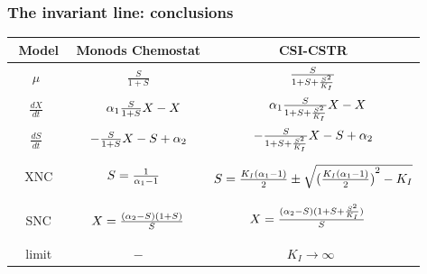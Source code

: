 \documentclass[a4paper, 10pt, twoside, openright]{book}
\begin{document}
\subsubsection*{The invariant line: conclusions}






\begin{tabular}{|c|c|c|} \hline %
$\phantom{\Bigg(}$Model$\phantom{\Bigg(}$ & Monods Chemostat & CSI-CSTR \\ 
\hline %
$\mu\phantom{\Bigg(}$
& $\frac{ S} {1+S}$
& $\frac{ S} {1+S+\frac{{S}^{2}}{{K}_{I}}}$ \\ %
$\frac{dX}{dt} \phantom{\Bigg(}$ 
& $\phantom{-}{\alpha}_{1}\frac{ S}{1+S}X-X$        
& $\phantom{-}{\alpha}_{1}\frac{ S}{1+S+\frac{{S}^{2}}{{K}_{I}}}X-X $  \\
$\frac{dS}{dt} \phantom{\Bigg)}$ 
& $-\frac{S} {1+S}X-S+{\alpha}_{2} $        
& $-\frac{S} {1+S+\frac{{S}^{2}}{{K}_{I}}}X-S+{\alpha}_{2}$        \\ %
XNC%
& $S=\frac{1}{{\alpha}_{1} - 1} \phantom{\Bigg(}$
& $S=\frac{{K}_{I}({\alpha}_{1}-1)}{2}\pm\sqrt{{(\frac{{K}_{I}({\alpha}_{1}-1)}{2})}^{2}-{K}_{I}}$ \\
SNC%
& $ X= \frac{ ({\alpha}_{2}-S)(1+S) }  { S }$ 
& $ X=
\frac{({\alpha}_{2}-S)(1+S+\frac{{S}^{2}}{{K}_{I}})}{S}\phantom{\Bigg(} $\\ 
limit%
& $-$
& $ K_I \rightarrow \infty\phantom{\Bigg(}$  \\ \hline 
\end{tabular}
\end{document}
